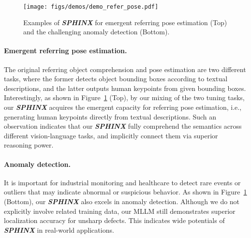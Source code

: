 \documentclass{article} \usepackage{iclr2024_conference,times}
\begin{document}
\begin{figure}[t]
    \centering
\texttt{[image: figs/demos/demo\_refer\_pose.pdf]}
    \caption{Examples of \textcolor{Goldenrod3}{\textbf{\textit{SPHINX}}} for emergent referring pose estimation (Top) and the challenging anomaly detection (Bottom). 
    }
    \label{fig:demo_refer_pose}
\end{figure}

\paragraph{Emergent referring pose estimation.}
The original referring object comprehension and pose estimation are two different tasks, where the former detects object bounding boxes according to textual descriptions, and the latter outputs human keypoints from given bounding boxes. Interestingly, as shown in Figure~\ref{fig:demo_refer_pose} (Top), by our mixing of the two tuning tasks, our \textcolor{Goldenrod3}{\textbf{\textit{SPHINX}}} acquires the emergent capacity for referring pose estimation, i.e., generating human keypoints directly from textual descriptions. Such an observation indicates that our \textcolor{Goldenrod3}{\textbf{\textit{SPHINX}}} fully comprehend the semantics across different vision-language tasks, and implicitly connect them via superior reasoning power.

\paragraph{Anomaly detection.}
It is important for industrial monitoring and healthcare to detect rare events or outliers that may indicate abnormal or suspicious behavior.
As shown in Figure~\ref{fig:demo_refer_pose} (Bottom), our \textcolor{Goldenrod3}{\textbf{\textit{SPHINX}}} also excels in anomaly detection. Although we do not explicitly involve related training data, our MLLM still demonstrates superior localization accuracy for unsharp defects. This indicates wide potentials of \textcolor{Goldenrod3}{\textbf{\textit{SPHINX}}} in real-world applications.
\end{document}
